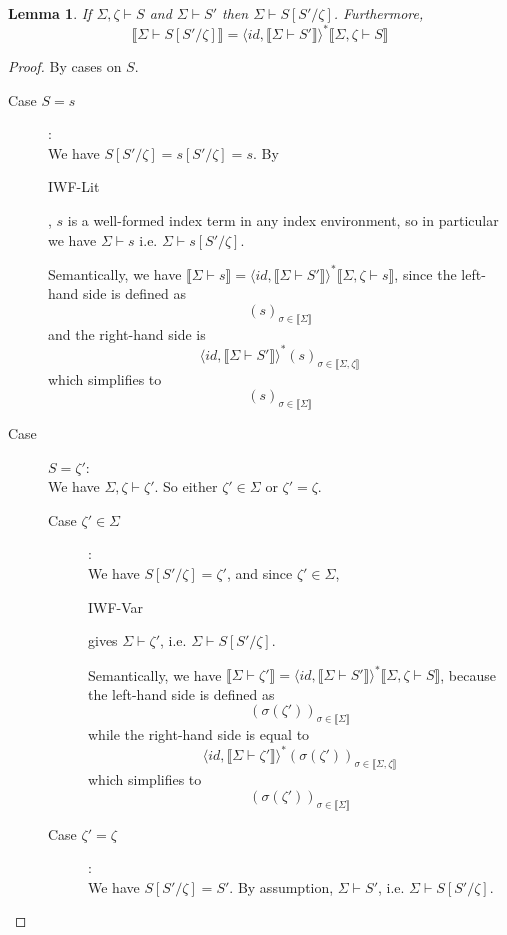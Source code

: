 \documentclass{article}
\newtheorem{lemma}{Lemma}
\newcommand{\sem}[1]{\llbracket #1 \rrbracket}
\newcommand{\sdisp}[1]{
\left( #1 \right)
}
\begin{document}
\begin{lemma}
If $\Sigma,\zeta \vdash S$ and $\Sigma \vdash S'$ then $\Sigma \vdash S[S'/\zeta]$. Furthermore, $$\sem{\Sigma \vdash S[S'/\zeta]} = \langle \mathit{id}, \sem{\Sigma \vdash S'} \rangle^* \sem{\Sigma,\zeta \vdash S}$$
\label{SWF-Subst}
\end{lemma}
\begin{proof}
By cases on $S$.

\begin{description}
\item[Case $S = s$]:\\
We have $S[S'/\zeta] = s[S'/\zeta] = s$. By \begin{sc}IWF-Lit\end{sc}, $s$ is a well-formed index term in any index environment, so in particular we have $\Sigma \vdash s$ i.e. $\Sigma \vdash s[S'/\zeta]$.

Semantically, we have $\sem{\Sigma \vdash s} = \langle \mathit{id}, \sem{\Sigma \vdash S'} \rangle^* \sem{\Sigma,\zeta \vdash s}$, since the left-hand side is defined as $$( s )_{\sigma \in \sem{\Sigma}}$$ and the right-hand side is $$\langle \mathit{id}, \sem{\Sigma \vdash S'} \rangle^* ( s )_{\sigma \in \sem{\Sigma,\zeta}}$$ which simplifies to $$ ( s )_{\sigma \in \sem{\Sigma}}$$

\item[Case ]$S = \zeta'$:\\
We have $\Sigma,\zeta \vdash \zeta'$. So either $\zeta' \in \Sigma$ or $\zeta' = \zeta$.

\begin{description}
\item[Case $\zeta' \in \Sigma$]:\\
We have $S[S'/\zeta] = \zeta'$, and since $\zeta' \in \Sigma$, \begin{sc}IWF-Var\end{sc} gives $\Sigma \vdash \zeta'$, i.e. $\Sigma \vdash S[S'/\zeta]$.

Semantically, we have $\sem{\Sigma \vdash \zeta'} = \langle \mathit{id}, \sem{\Sigma \vdash S'} \rangle^* \sem{\Sigma,\zeta \vdash S}$, because the left-hand side is defined as $$\sdisp{\sigma(\zeta')}_{\sigma \in \sem{\Sigma}}$$ while the right-hand side is equal to $$\langle \mathit{id}, \sem{\Sigma \vdash \zeta'} \rangle^* (\sigma(\zeta'))_{\sigma \in \sem{\Sigma,\zeta}}$$ which simplifies to $$(\sigma(\zeta'))_{\sigma \in \sem{\Sigma}}$$
 
\item[Case $\zeta' = \zeta$]:\\
We have $S[S'/\zeta] = S'$. By assumption, $\Sigma \vdash S'$, i.e. $\Sigma \vdash S[S'/\zeta]$.


\end{description}
\end{description}
\end{proof}
\end{document}
